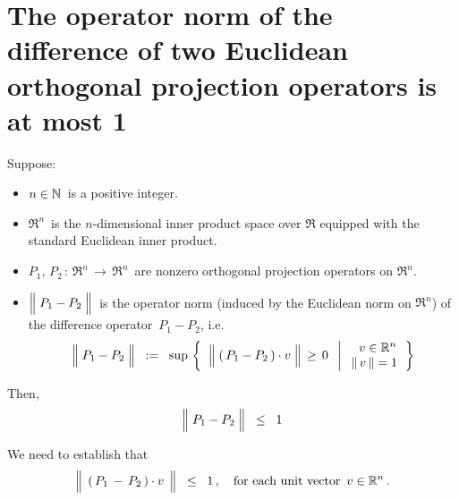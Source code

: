 

\section{The operator norm of the difference of two Euclidean orthogonal projection operators is at most 1}
\setcounter{theorem}{0}
\setcounter{equation}{0}


\renewcommand{\theenumi}{\roman{enumi}}
\renewcommand{\labelenumi}{\textnormal{(\theenumi)}$\;\;$}


\begin{proposition}
\mbox{}\vskip 0.1cm
\noindent
Suppose:
\begin{itemize}
\item
	$n \in \mathbb{N}$\, is a positive integer.
\item
	$\Re^{n}$\, is the $n$-dimensional inner product space over $\Re$ equipped with the standard Euclidean inner product.
\item
	$P_{1}, \, P_{2} \, : \, \Re^{n} \, \longrightarrow \, \Re^{n}$\,
	are nonzero orthogonal projection operators on $\Re^{n}$.
\item
	$\left\Vert\; P_{1} \overset{{\color{white}.}}{-} P_{2} \;\right\Vert$\,
	is the operator norm (induced by the Euclidean norm on $\Re^{n}$)
	of the difference operator \,$P_{1} - P_{2}$, i.e.
	\begin{equation*}
	\left\Vert\; P_{1} \overset{{\color{white}.}}{-} P_{2} \;\right\Vert
	\;\; := \;\;
		\sup\,\left\{\;\;
			\left\Vert\;(\,P_{1} \overset{{\color{white}.}}{-} P_{2}\,) \cdot v \;\right\Vert \,\geq\, 0
			\;\;\left\vert\;
			\begin{array}{c}
				{\color{white}..}v \in \Re^{n} \\ \Vert\,v\,\Vert = 1
				\end{array}
			\right.\right\}
	\end{equation*}
\end{itemize}
Then,
\begin{equation*}
\left\Vert\; P_{1} \overset{{\color{white}.}}{-} P_{2} \;\right\Vert
\;\; \leq \;\;
	1
\end{equation*}
\end{proposition}
\proof
We need to establish that
\begin{equation}\label{wantToProve}
\left\Vert\;\, (\,P_{1} \,\overset{{\color{white}.}}{-}\, P_{2}\,)\cdot v \,\;\right\Vert
\;\; \leq \;\;
	1\,,
\quad
\textnormal{for each unit vector \,$v \in \Re^{n}$}\,.
\end{equation}

